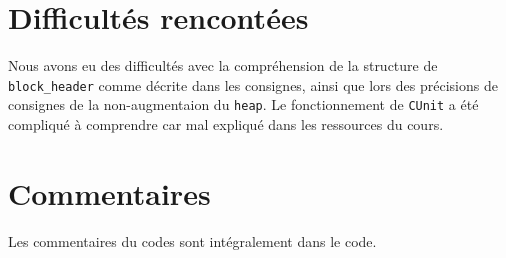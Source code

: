 \documentclass[10pt,a4paper]{article}
\begin{document}
\section{Difficultés rencontées}
Nous avons eu des difficultés avec la compréhension de la structure de \texttt{block\_header} comme décrite dans les consignes, ainsi que lors des précisions de consignes de la non-augmentaion du \texttt{heap}.
Le fonctionnement de \texttt{CUnit} a été compliqué à comprendre car mal expliqué dans les ressources du cours.

\section{Commentaires}
Les commentaires du codes sont intégralement dans le code.
\end{document}
